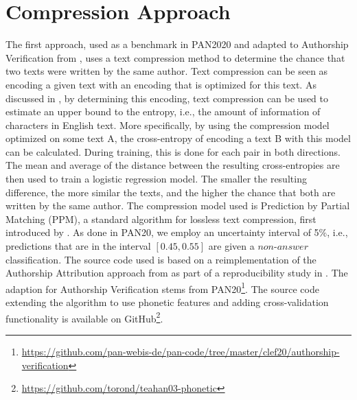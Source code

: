\section{Compression Approach}\label{sec:compression-approach}
The first approach, used as a benchmark in PAN2020 and adapted to Authorship Verification from \cite{teahan2003compression}, uses a text compression method to determine the chance that two texts were written by the same author.
Text compression can be seen as encoding a given text with an encoding that is optimized for this text.
As discussed in \cite{brown1992upperBoundEntropy}, by determining this encoding, text compression can be used to estimate an upper bound to the entropy, i.e., the amount of information of characters in English text.
More specifically, by using the compression model optimized on some text A, the cross-entropy of encoding a text B with this model can be calculated.
During training, this is done for each pair in both directions.
The mean and average of the distance between the resulting cross-entropies are then used to train a logistic regression model.
The smaller the resulting difference, the more similar the texts, and the higher the chance that both are written by the same author.
The compression model used is Prediction by Partial Matching (PPM), a standard algorithm for lossless text compression, first introduced by \cite{cleary1984PPM}.
As done in PAN20, we employ an uncertainty interval of 5\%, i.e., predictions that are in the interval $[0.45, 0.55]$ are given a $non$-$answer$ classification.
The source code used is based on a reimplementation of the Authorship Attribution approach from \cite{teahan2003compression} as part of a reproducibility study in \cite{potthast2016reimplementation}.
The adaption for Authorship Verification stems from PAN20\footnote{\url{https://github.com/pan-webis-de/pan-code/tree/master/clef20/authorship-verification}}.
The source code extending the algorithm to use phonetic features and adding cross-validation functionality is available on GitHub\footnote{\url{https://github.com/torond/teahan03-phonetic}}.

